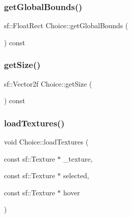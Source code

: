 \subsubsection{\texorpdfstring{get\+Global\+Bounds()}{getGlobalBounds()}}
{\footnotesize\ttfamily sf\+::\+Float\+Rect Choice\+::get\+Global\+Bounds (\begin{DoxyParamCaption}{ }\end{DoxyParamCaption}) const}

\mbox{\label{class_choice_ad013aa52558a29430889b9c6e9c0a1ab}} 
\subsubsection{\texorpdfstring{get\+Size()}{getSize()}}
{\footnotesize\ttfamily sf\+::\+Vector2f Choice\+::get\+Size (\begin{DoxyParamCaption}{ }\end{DoxyParamCaption}) const}

\mbox{\label{class_choice_a70d994feb4c3215eb477bae3df7c5052}} 
\subsubsection{\texorpdfstring{load\+Textures()}{loadTextures()}}
{\footnotesize\ttfamily void Choice\+::load\+Textures (\begin{DoxyParamCaption}\item[{const sf\+::\+Texture $\ast$}]{\+\_\+texture,  }\item[{const sf\+::\+Texture $\ast$}]{selected,  }\item[{const sf\+::\+Texture $\ast$}]{hover }\end{DoxyParamCaption})\hspace{0.3cm}{\ttfamily [virtual]}}

